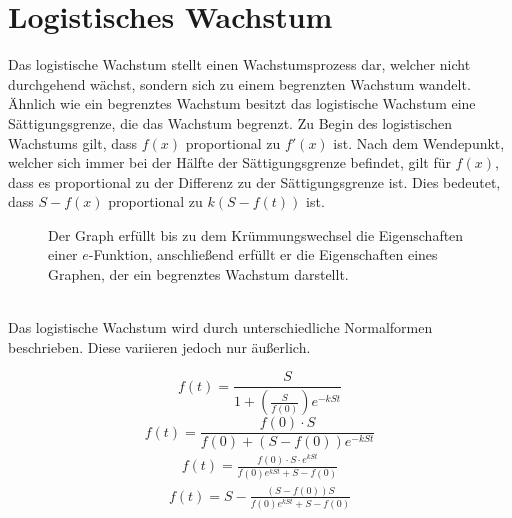 \section{Logistisches Wachstum}
Das logistische Wachstum stellt einen Wachstumsprozess dar, welcher nicht durchgehend wächst, sondern sich zu einem begrenzten Wachstum wandelt. Ähnlich wie ein begrenztes Wachstum besitzt das logistische Wachstum eine Sättigungsgrenze, die das Wachstum begrenzt. Zu Begin des logistischen Wachstums gilt, dass $f(x)$ proportional zu $f'(x)$ ist. Nach dem Wendepunkt, welcher sich immer bei der Hälfte der Sättigungsgrenze befindet, gilt für $f(x)$, dass es proportional zu der Differenz zu der Sättigungsgrenze ist. Dies bedeutet, dass $S-f(x)$ proportional zu $k(S-f(t))$ ist.
\begin{figure}[h]
	\centering
	\caption{Der Graph erfüllt bis zu dem Krümmungswechsel die Eigenschaften einer $e$-Funktion, anschließend erfüllt er die Eigenschaften eines Graphen, der ein begrenztes Wachstum darstellt.  }
\end{figure}\\
Das logistische Wachstum wird durch unterschiedliche Normalformen beschrieben. Diese variieren jedoch nur äußerlich. 
	\begin{paracol}{2}
		\[f(t)=\frac{S}{1+\left(\frac{S}{f(0)}\right)e^{-kSt}}\]
		\[f(t)=\frac{f(0)\cdot S}{f(0)+(S-f(0))e^{-kSt}}\]
	\switchcolumn
		\begin{align*}
			f(t)=\frac{f(0)\cdot S\cdot e^{kSt}}{f(0)e^{kSt}+S-f(0)}
		\end{align*}
		\begin{align*}
			f(t)=S-\frac{(S-f(0))S}{f(0)e^{kSt}+S-f(0)}
		\end{align*}
	\end{paracol}
\pagebreak